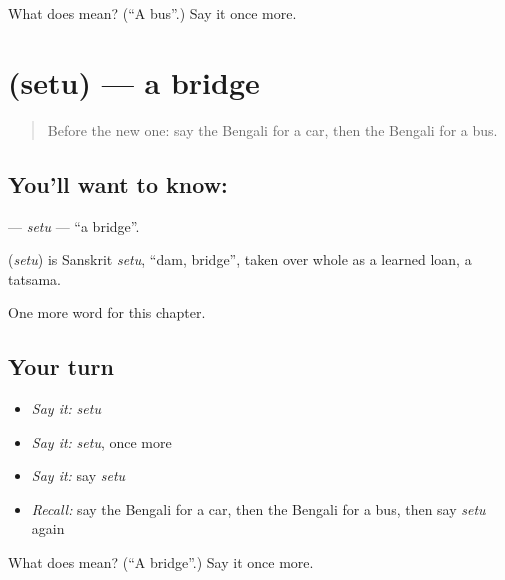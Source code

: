 \begin{tcolorbox}[breakable,colback=teal!4,colframe=teal!35!black,title={Before you move on}]
What does  mean? (\textquotedblleft{}A bus\textquotedblright{}.) Say it once more.
\end{tcolorbox}
\section[\texorpdfstring{\bn{সেতু} (setu)}{সেতু (setu)}]{ (setu) — a bridge}

\label{lesson:BN-C83-setu}



\begin{quote}
Before the new one: say the Bengali for a car, then the Bengali for a bus.
\end{quote}

\subsection*{You'll want to know: }
\textbf{} — \emph{setu} — \textquotedblleft{}a bridge\textquotedblright{}.

\begin{cousinweb}
\textbf{} (\emph{setu}) is Sanskrit \emph{setu}, \textquotedblleft{}dam, bridge\textquotedblright{}, taken over whole as a learned loan, a tatsama.
\end{cousinweb}

\begin{grammarlens}[title={What you've built}]
One more word for this chapter.
\end{grammarlens}

\subsection*{Your turn}
\begin{itemize}
\raggedright
  \item \emph{Say it:} \emph{setu}
  \item \emph{Say it:} \emph{setu}, once more
  \item \emph{Say it:} say \emph{setu}
  \item \emph{Recall:} say the Bengali for a car, then the Bengali for a bus, then say \emph{setu} again
\end{itemize}

\begin{tcolorbox}[breakable,colback=teal!4,colframe=teal!35!black,title={Before you move on}]
What does  mean? (\textquotedblleft{}A bridge\textquotedblright{}.) Say it once more.
\end{tcolorbox}
